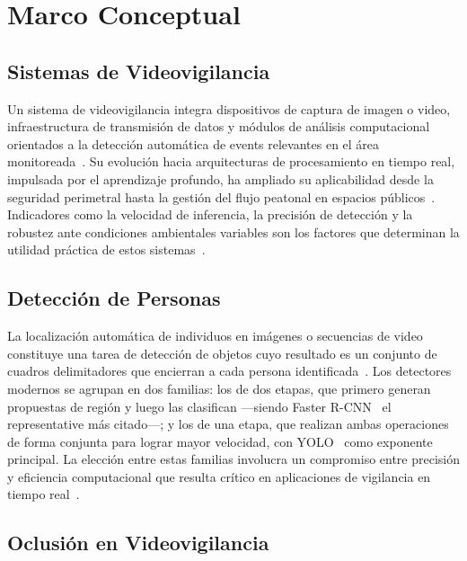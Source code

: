 \documentclass[12pt, a4paper]{article}
\begin{document}
\section{Marco Conceptual}
\label{sec:marco}

\subsection{Sistemas de Videovigilancia}

Un sistema de videovigilancia integra dispositivos de captura de
imagen o video, infraestructura de transmisi\'{o}n de datos y
m\'{o}dulos de an\'{a}lisis computacional orientados a la
detecci\'{o}n autom\'{a}tica de events relevantes en el \'{a}rea
monitoreada~\cite{E24, E32}. Su evoluci\'{o}n hacia arquitecturas de
procesamiento en tiempo real, impulsada por el aprendizaje profundo, ha
ampliado su aplicabilidad desde la seguridad perimetral hasta la
gesti\'{o}n del flujo peatonal en espacios p\'{u}blicos~\cite{E12,
E09}. Indicadores como la velocidad de inferencia, la precisi\'{o}n de
detecci\'{o}n y la robustez ante condiciones ambientales variables son
los factores que determinan la utilidad pr\'{a}ctica de estos
sistemas~\cite{Brunetti2018}.

\subsection{Detecci\'{o}n de Personas}

La localizaci\'{o}n autom\'{a}tica de individuos en im\'{a}genes o
secuencias de video constituye una tarea de detecci\'{o}n de objetos
cuyo resultado es un conjunto de cuadros delimitadores que encierran a
cada persona identificada~\cite{Dollar2012}. Los detectores modernos se
agrupan en dos familias: los de dos etapas, que primero generan
propuestas de regi\'{o}n y luego las clasifican ---siendo Faster
R-CNN~\cite{Ren2015} el representative m\'{a}s citado---; y los de una
etapa, que realizan ambas operaciones de forma conjunta para lograr
mayor velocidad, con YOLO~\cite{Redmon2016} como exponente principal.
La elecci\'{o}n entre estas familias involucra un compromiso entre
precisi\'{o}n y eficiencia computacional que resulta cr\'{i}tico en
aplicaciones de vigilancia en tiempo real~\cite{E25, E23}.

\subsection{Oclusi\'{o}n en Videovigilancia}
\end{document}
